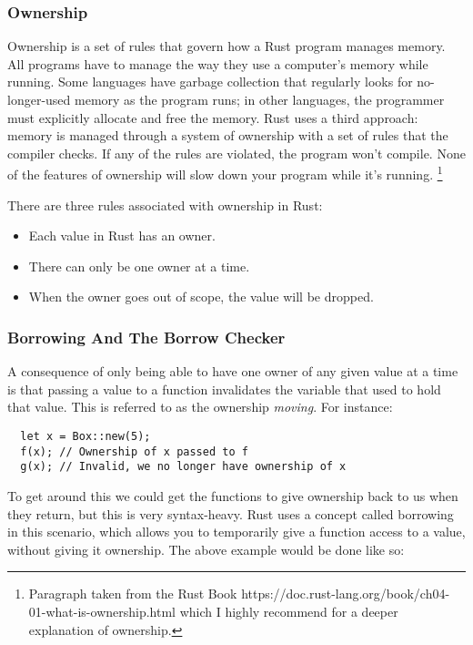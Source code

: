 \documentclass[12pt,twoside]{report}
\begin{document}
\subsubsection{Ownership}
Ownership is a set of rules that govern how a Rust program manages memory. All programs have to manage the way they use a computer’s memory while running. Some languages have garbage collection that regularly looks for no-longer-used memory as the program runs; in other languages, the programmer must explicitly allocate and free the memory. Rust uses a third approach: memory is managed through a system of ownership with a set of rules that the compiler checks. If any of the rules are violated, the program won’t compile. None of the features of ownership will slow down your program while it’s running. \footnote{Paragraph taken from the Rust Book https://doc.rust-lang.org/book/ch04-01-what-is-ownership.html which I highly recommend for a deeper explanation of ownership.}

There are three rules associated with ownership in Rust:
\begin{itemize}
  \item Each value in Rust has an owner.
  \item There can only be one owner at a time.
  \item When the owner goes out of scope, the value will be dropped.
\end{itemize}

\subsubsection{Borrowing And The Borrow Checker}
A consequence of only being able to have one owner of any given value at a time is that passing a value to a function invalidates the variable that used to hold that value. This is referred to as the ownership \textit{moving}. For instance:

\begin{lstlisting}
  let x = Box::new(5);
  f(x); // Ownership of x passed to f
  g(x); // Invalid, we no longer have ownership of x
\end{lstlisting}

To get around this we could get the functions to give ownership back to us when they return, but this is very syntax-heavy. Rust uses a concept called borrowing in this scenario, which allows you to temporarily give a function access to a value, without giving it ownership. The above example would be done like so:
\end{document}
